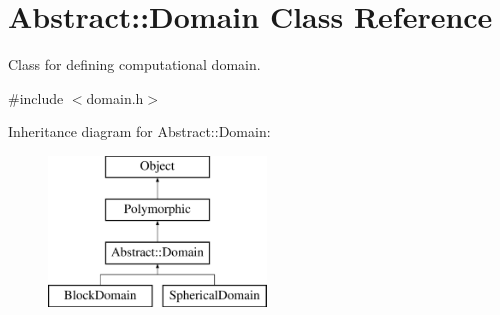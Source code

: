 \hypertarget{classAbstract_1_1Domain}{}\section{Abstract\+:\+:Domain Class Reference}
\label{classAbstract_1_1Domain}


Class for defining computational domain.  




{\ttfamily \#include $<$domain.\+h$>$}

Inheritance diagram for Abstract\+:\+:Domain\+:\begin{figure}[H]
\begin{center}
\leavevmode
\includegraphics[height=4.000000cm]{classAbstract_1_1Domain}
\end{center}
\end{figure}
